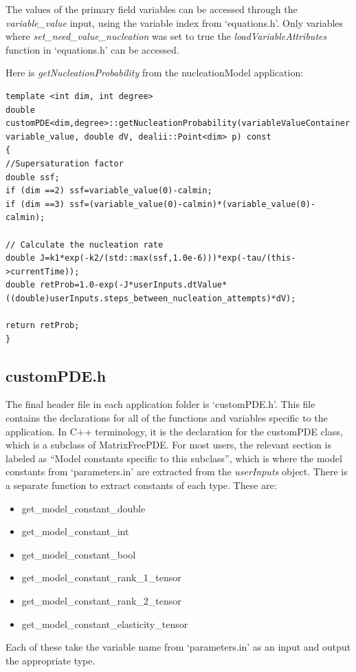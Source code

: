 \documentclass[10pt]{article} %
\begin{document}
The values of the primary field variables can be accessed through the \emph{variable\_value} input, using the variable index from `equations.h'. Only variables where \emph{set\_need\_value\_nucleation} was set to true the \emph{loadVariableAttributes} function in `equations.h' can be accessed.

Here is \emph{getNucleationProbability} from the nucleationModel application:
\scriptsize
\begin{lstlisting}
template <int dim, int degree>
double customPDE<dim,degree>::getNucleationProbability(variableValueContainer variable_value, double dV, dealii::Point<dim> p) const
{
//Supersaturation factor
double ssf;
if (dim ==2) ssf=variable_value(0)-calmin;
if (dim ==3) ssf=(variable_value(0)-calmin)*(variable_value(0)-calmin);
	
// Calculate the nucleation rate
double J=k1*exp(-k2/(std::max(ssf,1.0e-6)))*exp(-tau/(this->currentTime));
double retProb=1.0-exp(-J*userInputs.dtValue*((double)userInputs.steps_between_nucleation_attempts)*dV);
   	
return retProb;
}
\end{lstlisting}
\normalsize

\subsection{customPDE.h}
The final header file in each application folder is `customPDE.h'. This file contains the declarations for all of the functions and variables specific to the application. In C++ terminology, it is the declaration for the customPDE class, which is a subclass of MatrixFreePDE. For most users, the relevant section is labeled as ``Model constants specific to this subclass'', which is where the model constants from `parameters.in' are extracted from the \emph{userInputs} object. There is a separate function to extract constants of each type. These are:
\begin{itemize}
\item get\_model\_constant\_double
\item get\_model\_constant\_int
\item get\_model\_constant\_bool
\item get\_model\_constant\_rank\_1\_tensor
\item get\_model\_constant\_rank\_2\_tensor
\item get\_model\_constant\_elasticity\_tensor
\end{itemize}

Each of these take the variable name from `parameters.in' as an input and output the appropriate type.
\end{document}

